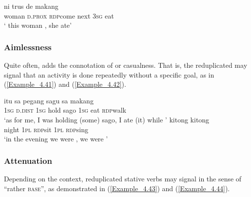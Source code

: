 \ea
\label{Example_4.40}
 {ni} {} {trus} {de} {makang}\\ %
 woman  \textsc{d.prox}  \textsc{rdp}{\Tilde}come  next  \textsc{3sg}  eat\\
\glt
‘ this woman , she ate’ \textstyleExampleSource{[Elicited BR120813.008]}
\z


\subsubsection[Aimlessness]{Aimlessness}\label{Para_4.2.2.5}

Quite often,  adds the connotation of  or casualness. That is, the reduplicated  may signal that an activity is done repeatedly without a specific goal, as in (\ref{Example_4.41}) and (\ref{Example_4.42}).


\ea
\label{Example_4.41}
 {itu} {sa} {pegang} {sagu} {sa} {makang} {}\\ %
 \textsc{1sg}  \textsc{d.dist}  \textsc{1sg}  hold  sago  \textsc{1sg}  eat  \textsc{rdp}{\Tilde}walk\\
\glt 
‘as for me, I was holding (some) sago, I ate (it) while ’ \textstyleExampleSource{[081025-009a-Cv.0073]}
\z
\ea
\label{Example_4.42}
 {kitong} {} {kitong} {}\\ %
 night  \textsc{1pl}  \textsc{rdp}{\Tilde}sit  \textsc{1pl}  \textsc{rdp}{\Tilde}sing\\
\glt
‘in the evening we were , we were ’ \textstyleExampleSource{[081025-009a-Cv.0001]}
\z


\subsubsection[Attenuation]{Attenuation}\label{Para_4.2.2.6}

Depending on the context, reduplicated stative verbs may signal  in the sense of ``rather \textsc{base}'', as demonstrated in (\ref{Example_4.43}) and (\ref{Example_4.44}).



